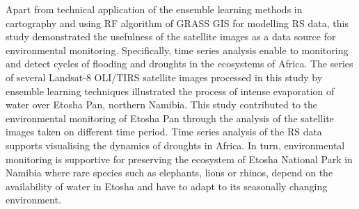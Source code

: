 \documentclass[climate,article,submit,pdftex,moreauthors]{Definitions/mdpi}
\begin{document}
Apart from technical application of the ensemble learning methods in cartography and using RF algorithm of GRASS GIS for modelling RS data, this study demonstrated the usefulness of the satellite images as a data source for environmental monitoring. Specifically, time series analysis enable to monitoring and detect cycles of flooding and droughts in the ecosystems of Africa. The series of several Landsat-8 OLI/TIRS satellite images processed in this study by ensemble learning techniques illustrated the process of intense evaporation of water over Etosha Pan, northern Namibia. This study contributed to the environmental monitoring of Etosha Pan through the analysis of the satellite images taken on different time period. Time series analysis of the RS data supports visualising the dynamics of droughts in Africa. In turn, environmental monitoring is supportive for preserving the ecosystem of Etosha National Park in Namibia where rare species such as elephants, lions or rhinos, depend on the availability of water in Etosha and have to adapt to its seasonally changing environment. 







\end{document}
